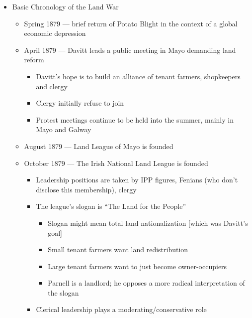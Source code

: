 \documentclass[12pt]{article}
\begin{document}
\begin{itemize}
\begin{itemize}
\begin{itemize}
                    \end{itemize}
                \end{itemize}
                \item Basic Chronology of the Land War
                \begin{itemize}
                    \item Spring 1879 --- brief return of Potato Blight in the context of a global economic depression
                    \item April 1879 --- Davitt leads a public meeting in Mayo demanding land reform
                    \begin{itemize}
                        \item Davitt's hope is to build an alliance of tenant farmers, shopkeepers and clergy
                        \item Clergy initially refuse to join
                        \item Protest meetings continue to be held into the summer, mainly in Mayo and Galway
                    \end{itemize}
                    \item August 1879 --- Land League of Mayo is founded
                    \item October 1879 --- The Irish National Land League is founded
                    \begin{itemize}
                        \item Leadership positions are taken by IPP figures, Fenians (who don't disclose this membership), clergy
                        \item The league's slogan is ``The Land for the People''
                        \begin{itemize}
                            \item Slogan might mean total land nationalization [which was Davitt's goal]
                            \item Small tenant farmers want land redistribution
                            \item Large tenant farmers want to just become owner-occupiers
                            \item Parnell is a landlord; he opposes a more radical interpretation of the slogan
                        \end{itemize}
                        \item Clerical leadership plays a moderating/conservative role

\end{itemize}
\end{itemize}
\end{itemize}
\end{document}
